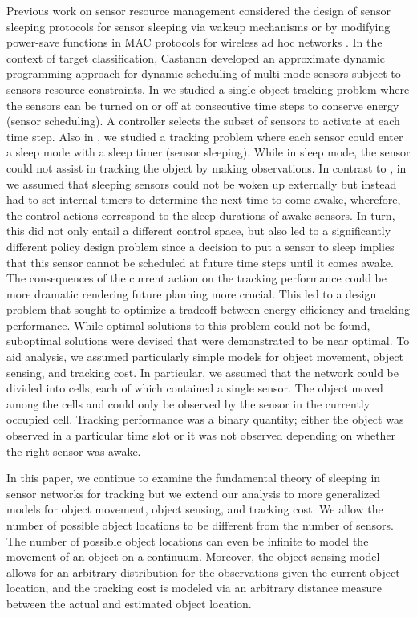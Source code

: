 \documentclass[journal,draftcls,onecolumn,11pt]{IEEEtran}
\begin{document}
Previous work on sensor resource management considered the design of sensor sleeping protocols for sensor sleeping via wakeup mechanisms \cite{brooks03,balasubramanian04,gupta03,yang03,xu04,yang06} or by modifying power-save functions in MAC protocols for wireless ad hoc networks \cite{gui04,gui05,vasanthi06}. In the context of target classification, Castanon \cite{castanon} developed an approximate dynamic programming approach for dynamic scheduling of multi-mode sensors subject to sensors resource constraints. In \cite{asilomar_scheduling,tsp_scheduling} we studied a single object tracking problem where the sensors can be turned on or off at consecutive time steps to conserve energy (sensor scheduling). A controller selects the subset of sensors to activate at each time step. Also in \cite{fuemmeler08}, we studied a tracking problem where each sensor could enter a sleep mode with a sleep timer (sensor sleeping). While in sleep mode, the sensor could not assist in tracking the object by making observations. In contrast to \cite{tsp_scheduling}, in \cite{fuemmeler08} we assumed that sleeping sensors could not be woken up externally but instead had to set internal timers to determine the next time to come awake, wherefore, the control actions correspond to the sleep durations of awake sensors. In turn, this did not only entail a different control space, but also led to a significantly different policy design problem since a decision to put a sensor to sleep implies that this sensor cannot be scheduled at future time steps until it comes awake. The consequences of the current action on the tracking performance could be more dramatic rendering future planning more crucial. This led to a design problem that sought to optimize a tradeoff between energy efficiency and tracking performance. While optimal solutions to this problem could not be found, suboptimal solutions were devised that were demonstrated to be near optimal. To aid analysis, we assumed particularly simple models for object movement, object sensing, and tracking cost.  In particular, we assumed that the network could be divided into cells, each of which contained a single sensor.  The object moved among the cells and could only be observed by the sensor in the currently occupied cell.  Tracking performance was a binary quantity; either the object was observed in a particular time slot or it was not observed depending on whether the right sensor was awake.

In this paper, we continue to examine the fundamental theory of sleeping in sensor networks for tracking but we extend our analysis to more generalized models for object movement, object sensing, and tracking cost. We allow the number of possible object locations to be different from the number of sensors. The number of possible object locations can even be infinite to model the movement of an object on a continuum. Moreover, the object sensing model allows for an arbitrary distribution for the observations given the current object location, and the tracking cost is modeled via an arbitrary distance measure between the actual and estimated object location.
\end{document}
